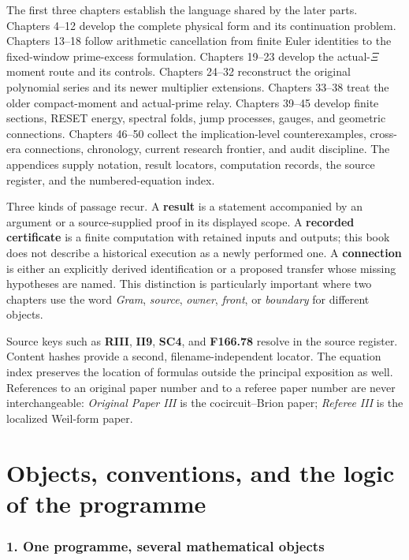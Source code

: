 \documentclass[
  10pt,
  a4paper,
  10pt,
  oneside,
  openany]{book}
\begin{document}
The first three chapters establish the language shared by the later
parts. Chapters 4--12 develop the complete physical form and its
continuation problem. Chapters 13--18 follow arithmetic cancellation
from finite Euler identities to the fixed-window prime-excess
formulation. Chapters 19--23 develop the actual-\(\Xi\) moment route and
its controls. Chapters 24--32 reconstruct the original polynomial series
and its newer multiplier extensions. Chapters 33--38 treat the older
compact-moment and actual-prime relay. Chapters 39--45 develop finite
sections, RESET energy, spectral folds, jump processes, gauges, and
geometric connections. Chapters 46--50 collect the implication-level
counterexamples, cross-era connections, chronology, current research
frontier, and audit discipline. The appendices supply notation, result
locators, computation records, the source register, and the
numbered-equation index.

Three kinds of passage recur. A \textbf{result} is a statement
accompanied by an argument or a source-supplied proof in its displayed
scope. A \textbf{recorded certificate} is a finite computation with
retained inputs and outputs; this book does not describe a historical
execution as a newly performed one. A \textbf{connection} is either an
explicitly derived identification or a proposed transfer whose missing
hypotheses are named. This distinction is particularly important where
two chapters use the word \emph{Gram}, \emph{source}, \emph{owner},
\emph{front}, or \emph{boundary} for different objects.

Source keys such as \textbf{RIII}, \textbf{II9}, \textbf{SC4}, and
\textbf{F166.78} resolve in the source register. Content hashes provide
a second, filename-independent locator. The equation index preserves the
location of formulas outside the principal exposition as well.
References to an original paper number and to a referee paper number are
never interchangeable: \emph{Original Paper III} is the cocircuit--Brion
paper; \emph{Referee III} is the localized Weil-form paper.

\part{Objects, conventions, and the logic of the programme}

\section{1. One programme, several mathematical
objects}\label{ch-overview}
\end{document}
